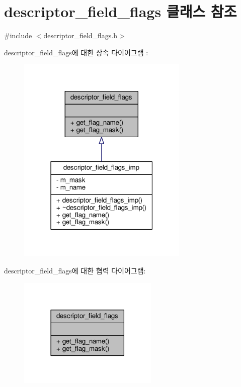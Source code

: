 \hypertarget{classavdecc__lib_1_1descriptor__field__flags}{}\section{descriptor\+\_\+field\+\_\+flags 클래스 참조}
\label{classavdecc__lib_1_1descriptor__field__flags}


{\ttfamily \#include $<$descriptor\+\_\+field\+\_\+flags.\+h$>$}



descriptor\+\_\+field\+\_\+flags에 대한 상속 다이어그램 \+: 
\nopagebreak
\begin{figure}[H]
\begin{center}
\leavevmode
\includegraphics[width=231pt]{classavdecc__lib_1_1descriptor__field__flags__inherit__graph}
\end{center}
\end{figure}


descriptor\+\_\+field\+\_\+flags에 대한 협력 다이어그램\+:
\nopagebreak
\begin{figure}[H]
\begin{center}
\leavevmode
\includegraphics[width=189pt]{classavdecc__lib_1_1descriptor__field__flags__coll__graph}
\end{center}
\end{figure}

